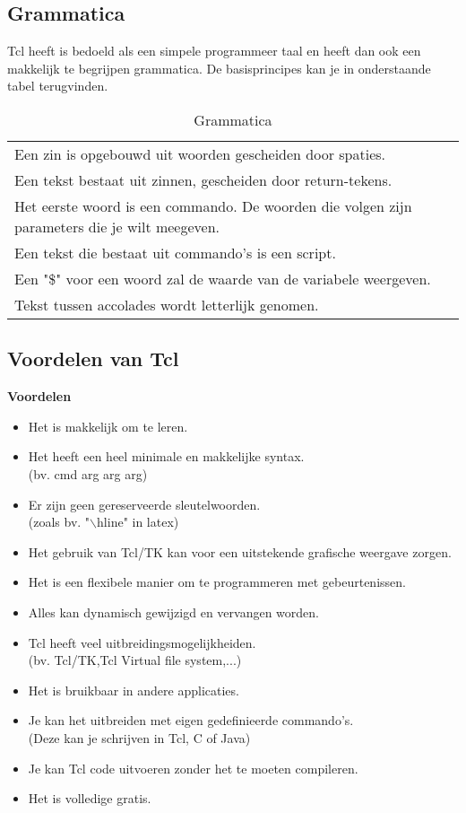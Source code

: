\documentclass{article}
\begin{document}
\begin{flushleft}
\subsection{Grammatica}
Tcl heeft is bedoeld als een simpele programmeer taal en heeft dan ook een makkelijk te begrijpen grammatica. De basisprincipes kan je in onderstaande tabel terugvinden.\\
\begin{table}[!ht]
\begin{tabular}{|l|}
\hline
	Een zin is opgebouwd uit woorden gescheiden door spaties.\\
	Een tekst bestaat uit zinnen, gescheiden door return-tekens.\\
	Het eerste woord is een commando. De woorden die volgen zijn parameters die je wilt meegeven.\\
	Een tekst die bestaat uit commando's is een script.\\
	Een "\$" voor een woord zal de waarde van de variabele weergeven.\\
	Tekst tussen accolades wordt letterlijk genomen.\\
	\hline
\end{tabular}
 \caption{Grammatica}
\end{table}
\newpage
\subsection{Voordelen van Tcl}
\textbf{Voordelen}
\begin{itemize}
	\item Het is makkelijk om te leren.\\
	\item Het heeft een heel minimale en makkelijke syntax.\\(bv. cmd arg arg arg)
	\item Er zijn geen gereserveerde sleutelwoorden.\\(zoals bv. "$\backslash$hline" in latex)
	\item Het gebruik van Tcl/TK kan voor een uitstekende grafische weergave zorgen.
	\item Het is een flexibele manier om te programmeren met gebeurtenissen.
	\item Alles kan dynamisch gewijzigd en vervangen worden.
	\item Tcl heeft veel uitbreidingsmogelijkheiden.\\(bv. Tcl/TK,Tcl Virtual file system,...)
	\item Het is bruikbaar in andere applicaties.
	\item Je kan het uitbreiden met eigen gedefinieerde commando's.\\(Deze kan je schrijven in Tcl, C of Java)
	\item Je kan Tcl code uitvoeren zonder het te moeten compileren.
	\item Het is volledige gratis.
\end{itemize}


\end{flushleft}
\end{document}
